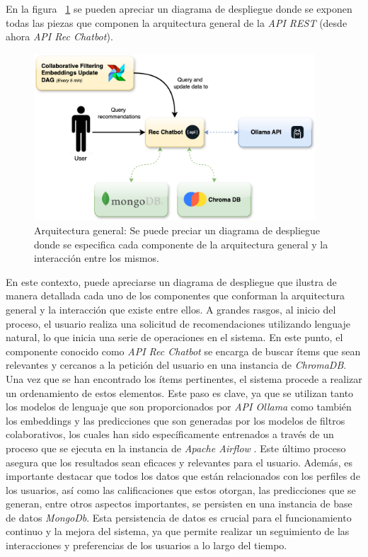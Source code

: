 \documentclass[11pt,a4paper,twoside]{thesis}
\begin{document}
En la figura ~\ref{fig:deployment} se pueden apreciar un diagrama de despliegue donde se exponen todas las piezas que componen la arquitectura general de la \textit{API REST} (desde ahora \textit{API Rec Chatbot}).

\begin{figure}[H]
	\centering
	\label{fig:deployment}
	\includegraphics[width=10.5cm]{./images/deployment.png}
	\caption{Arquitectura general: Se puede preciar un diagrama de despliegue donde se especifica cada componente de la arquitectura general y la interacción entre los mismos.}
\end{figure}

En este contexto, puede apreciarse un diagrama de despliegue que ilustra de manera detallada cada uno de los componentes que conforman la arquitectura general y la interacción que existe entre ellos. A grandes rasgos, al inicio del proceso, el usuario realiza una solicitud de recomendaciones utilizando lenguaje natural, lo que inicia una serie de operaciones en el sistema. En este punto, el componente conocido como \textit{API Rec Chatbot} se encarga de buscar ítems que sean relevantes y cercanos a la petición del usuario en una instancia de \textit{ChromaDB}. Una vez que se han encontrado los ítems pertinentes, el sistema procede a realizar un ordenamiento de estos elementos. Este paso es clave, ya que se utilizan tanto los modelos de lenguaje que son proporcionados por \textit{API Ollama} como también los embeddings y las predicciones que son generadas por los modelos de filtros colaborativos, los cuales han sido específicamente entrenados a través de un proceso que se ejecuta en la instancia de \textit{Apache Airflow} \cite{apache-airflow}. Este último proceso asegura que los resultados sean eficaces y relevantes para el usuario. Además, es importante destacar que todos los datos que están relacionados con los perfiles de los usuarios, así como las calificaciones que estos otorgan, las predicciones que se generan, entre otros aspectos importantes, se persisten en una instancia de base de datos \textit{MongoDb}. Esta persistencia de datos es crucial para el funcionamiento continuo y la mejora del sistema, ya que permite realizar un seguimiento de las interacciones y preferencias de los usuarios a lo largo del tiempo.
\end{document}
